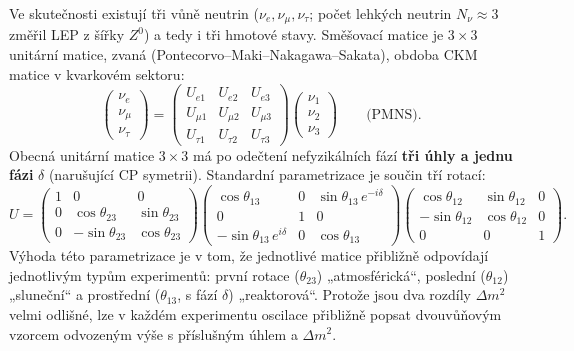 Ve skutečnosti existují tři vůně neutrin (\(\nu_e,\nu_\mu,\nu_\tau\); počet lehkých neutrin \(N_\nu\approx3\) změřil LEP z šířky \(Z^0\)) a tedy i tři hmotové stavy. Směšovací matice je \(3\times3\) unitární matice, zvaná  (Pontecorvo--Maki--Nakagawa--Sakata), obdoba CKM matice v kvarkovém sektoru:
\begin{equation}
  \begin{pmatrix}\nu_e\\ \nu_\mu\\ \nu_\tau\end{pmatrix}
  =\begin{pmatrix}U_{e1}&U_{e2}&U_{e3}\\ U_{\mu1}&U_{\mu2}&U_{\mu3}\\ U_{\tau1}&U_{\tau2}&U_{\tau3}\end{pmatrix}
  \begin{pmatrix}\nu_1\\ \nu_2\\ \nu_3\end{pmatrix}
  \qquad\text{(PMNS)}.
\end{equation}
Obecná unitární matice \(3\times3\) má po odečtení nefyzikálních fází \textbf{tři úhly a jednu fázi} \(\delta\) (narušující CP symetrii). Standardní parametrizace je součin tří rotací:
\begin{equation}
  U=\begin{pmatrix}1&0&0\\0&\cos\theta_{23}&\sin\theta_{23}\\0&-\sin\theta_{23}&\cos\theta_{23}\end{pmatrix}
  \begin{pmatrix}\cos\theta_{13}&0&\sin\theta_{13}\,e^{-i\delta}\\0&1&0\\-\sin\theta_{13}\,e^{i\delta}&0&\cos\theta_{13}\end{pmatrix}
  \begin{pmatrix}\cos\theta_{12}&\sin\theta_{12}&0\\-\sin\theta_{12}&\cos\theta_{12}&0\\0&0&1\end{pmatrix}.
\end{equation}
Výhoda této parametrizace je v tom, že jednotlivé matice přibližně odpovídají jednotlivým typům experimentů: první rotace (\(\theta_{23}\)) „atmosférická“, poslední (\(\theta_{12}\)) „sluneční“ a prostřední (\(\theta_{13}\), s fází \(\delta\)) „reaktorová“. Protože jsou dva rozdíly \(\Delta m^2\) velmi odlišné, lze v každém experimentu oscilace přibližně popsat dvouvůňovým vzorcem odvozeným výše s příslušným úhlem a \(\Delta m^2\).

